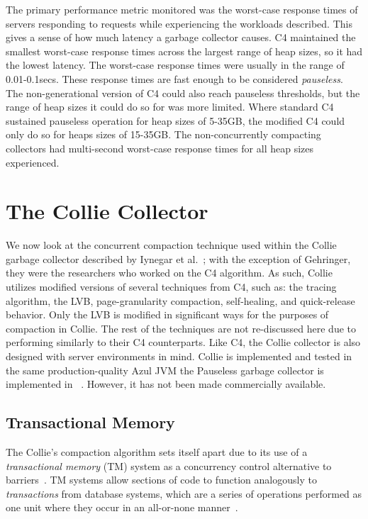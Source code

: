 \documentclass{sig-alternate}
\begin{document}
The primary performance metric monitored was the worst-case response times
of servers responding to requests while experiencing the workloads
described. This gives a sense of how much latency a garbage collector causes. 
C4 maintained the smallest 
worst-case response times across the largest range of heap sizes, so
it had the lowest latency.
The worst-case response times were usually in the range of 0.01-0.1secs. 
These response times are fast enough to be considered \emph{pauseless}. 
The non-generational version of C4 could also reach pauseless thresholds,
but the range of heap sizes it could do so for was more limited. Where standard
C4 sustained pauseless operation for heap sizes of 5-35GB, the modified C4 could
only do so for heaps sizes of 15-35GB. The non-concurrently compacting
collectors had multi-second worst-case response times for all heap sizes experienced.


\section{The Collie Collector}
\label{sec:collie}


We now look at the concurrent compaction technique used within the 
Collie garbage collector described by Iynegar et al.~\cite{Iyengar:Collie};
with the exception of Gehringer, they were the researchers who worked on the C4 algorithm.
As such, Collie utilizes modified versions of several techniques from C4, such as:
the tracing algorithm, the LVB, page-granularity compaction, self-healing, and quick-release behavior.
Only the LVB is modified in significant ways for the purposes of compaction in Collie.
The rest of the techniques are not re-discussed here due to performing 
similarly to their C4 counterparts. Like C4, the Collie
collector is also designed with server environments in mind. Collie is implemented and tested in 
the same production-quality Azul JVM the Pauseless garbage collector is implemented in
~\cite{Click:Pauseless}. However, it has not been made commercially available.


\subsection{Transactional Memory}
\label{sec:collieTM}

The Collie's compaction algorithm sets itself apart due to its use 
of a \emph{transactional memory} (TM) system as a concurrency control 
alternative to barriers~\cite{Iyengar:Collie}. TM systems allow
sections of code to function 
analogously to \emph{transactions} from database systems, 
which are a series of operations performed as one unit where 
they occur in an all-or-none manner~\cite{wiki:atomicity}.
\end{document}

